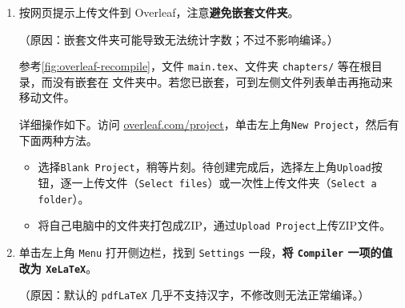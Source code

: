 \begin{enumerate}
  \item 按网页提示上传文件到 Overleaf，注意\textbf{避免嵌套文件夹}。

    （原因：嵌套文件夹可能导致无法统计字数；不过不影响编译。）

    参考\autoref{fig:overleaf-recompile}，文件 \texttt{main.tex}、文件夹 \texttt{chapters/} 等在根目录，而没有嵌套在  文件夹中。若您已嵌套，可到左侧文件列表单击再拖动来移动文件。

    详细操作如下。访问 \href{https://cn.overleaf.com/project}{overleaf.com/project}，单击左上角\texttt{New Project}，然后有下面两种方法。

    \begin{itemize}
      \item 选择\texttt{Blank Project}，稍等片刻。待创建完成后，选择左上角\texttt{Upload}按钮，逐一上传文件（\texttt{Select files}）或一次性上传文件夹（\texttt{Select a folder}）。
      \item 将自己电脑中的文件夹打包成ZIP，通过\texttt{Upload Project}上传ZIP文件。
    \end{itemize}

  \item 单击左上角 \texttt{Menu} 打开侧边栏，找到 \texttt{Settings} 一段，\textbf{将 \texttt{Compiler} 一项的值改为 \texttt{XeLaTeX}}。

    （原因：默认的 \texttt{pdfLaTeX} 几乎不支持汉字，不修改则无法正常编译。）
\end{enumerate}
